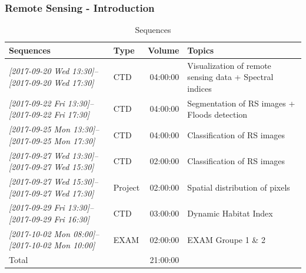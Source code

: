 \documentclass[a4paper,11pt,DIV=18]{scrartcl}
\begin{document}
\subsubsection{Remote Sensing - Introduction}
\label{sec:orgfbccd29}
\begin{table}[htb]\footnotesize
\caption{Sequences}
\centering
\begin{tabular}{llrl}
\toprule
Sequences & Type & Volume & Topics\\
\midrule
\textit{[2017-09-20 Wed 13:30]--[2017-09-20 Wed 17:30]} & CTD & 04:00:00 & Visualization of remote sensing data + Spectral indices\\
\textit{[2017-09-22 Fri 13:30]--[2017-09-22 Fri 17:30]} & CTD & 04:00:00 & Segmentation of RS images + Floods detection\\
\textit{[2017-09-25 Mon 13:30]--[2017-09-25 Mon 17:30]} & CTD & 04:00:00 & Classification of RS images\\
\textit{[2017-09-27 Wed 13:30]--[2017-09-27 Wed 15:30]} & CTD & 02:00:00 & Classification of RS images\\
\textit{[2017-09-27 Wed 15:30]--[2017-09-27 Wed 17:30]} & Project & 02:00:00 & Spatial distribution of pixels\\
\textit{[2017-09-29 Fri 13:30]--[2017-09-29 Fri 16:30]} & CTD & 03:00:00 & Dynamic Habitat Index\\
\textit{[2017-10-02 Mon 08:00]--[2017-10-02 Mon 10:00]} & EXAM & 02:00:00 & EXAM Groupe 1 \& 2\\
\midrule
Total &  & 21:00:00 & \\
\bottomrule
\end{tabular}
\end{table}
\end{document}
